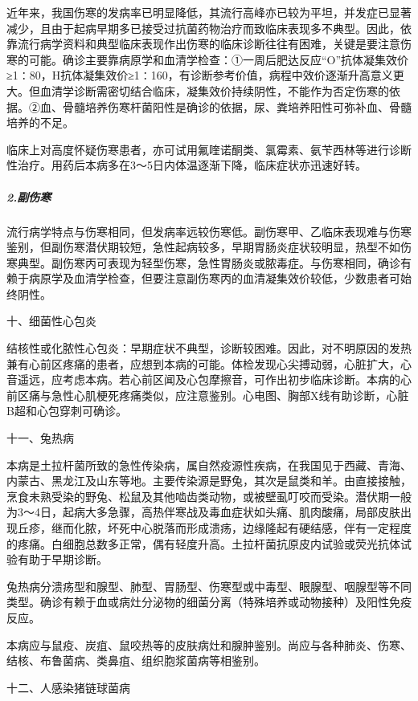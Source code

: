 近年来，我国伤寒的发病率已明显降低，其流行高峰亦已较为平坦，并发症已显著减少，且由于起病早期多已接受过抗菌药物治疗而致临床表现多不典型。因此，依靠流行病学资料和典型临床表现作出伤寒的临床诊断往往有困难，关键是要注意伤寒的可能。确诊主要靠病原学和血清学检查：①一周后肥达反应“O”抗体凝集效价≥1∶80，H抗体凝集效价≥1∶160，有诊断参考价值，病程中效价逐渐升高意义更大。但血清学诊断需密切结合临床，凝集效价持续阴性，不能作为否定伤寒的依据。②血、骨髓培养伤寒杆菌阳性是确诊的依据，尿、粪培养阳性可弥补血、骨髓培养的不足。

临床上对高度怀疑伤寒患者，亦可试用氟喹诺酮类、氯霉素、氨苄西林等进行诊断性治疗。用药后本病多在3～5日内体温逐渐下降，临床症状亦迅速好转。

\subparagraph{2.副伤寒}

流行病学特点与伤寒相同，但发病率远较伤寒低。副伤寒甲、乙临床表现难与伤寒鉴别，但副伤寒潜伏期较短，急性起病较多，早期胃肠炎症状较明显，热型不如伤寒典型。副伤寒丙可表现为轻型伤寒，急性胃肠炎或脓毒症。与伤寒相同，确诊有赖于病原学及血清学检查，但要注意副伤寒丙的血清凝集效价较低，少数患者可始终阴性。

\hypertarget{text00014.htmlux5cux23CHP2-5-1-2-10}{}
十、细菌性心包炎

结核性或化脓性心包炎：早期症状不典型，诊断较困难。因此，对不明原因的发热兼有心前区疼痛的患者，应想到本病的可能。体检发现心尖搏动弱，心脏扩大，心音遥远，应考虑本病。若心前区闻及心包摩擦音，可作出初步临床诊断。本病的心前区痛与急性心肌梗死疼痛类似，应注意鉴别。心电图、胸部X线有助诊断，心脏B超和心包穿刺可确诊。

\hypertarget{text00014.htmlux5cux23CHP2-5-1-2-11}{}
十一、兔热病

本病是土拉杆菌所致的急性传染病，属自然疫源性疾病，在我国见于西藏、青海、内蒙古、黑龙江及山东等地。主要传染源是野兔，其次是鼠类和羊。由直接接触，烹食未熟受染的野兔、松鼠及其他啮齿类动物，或被壁虱叮咬而受染。潜伏期一般为3～4日，起病大多急骤，高热伴寒战及毒血症状如头痛、肌肉酸痛，局部皮肤出现丘疹，继而化脓，坏死中心脱落而形成溃疡，边缘隆起有硬结感，伴有一定程度的疼痛。白细胞总数多正常，偶有轻度升高。土拉杆菌抗原皮内试验或荧光抗体试验有助于早期诊断。

兔热病分溃疡型和腺型、肺型、胃肠型、伤寒型或中毒型、眼腺型、咽腺型等不同类型。确诊有赖于血或病灶分泌物的细菌分离（特殊培养或动物接种）及阳性免疫反应。

本病应与鼠疫、炭疽、鼠咬热等的皮肤病灶和腺肿鉴别。尚应与各种肺炎、伤寒、结核、布鲁菌病、类鼻疽、组织胞浆菌病等相鉴别。

\hypertarget{text00014.htmlux5cux23CHP2-5-1-2-12}{}
十二、人感染猪链球菌病

